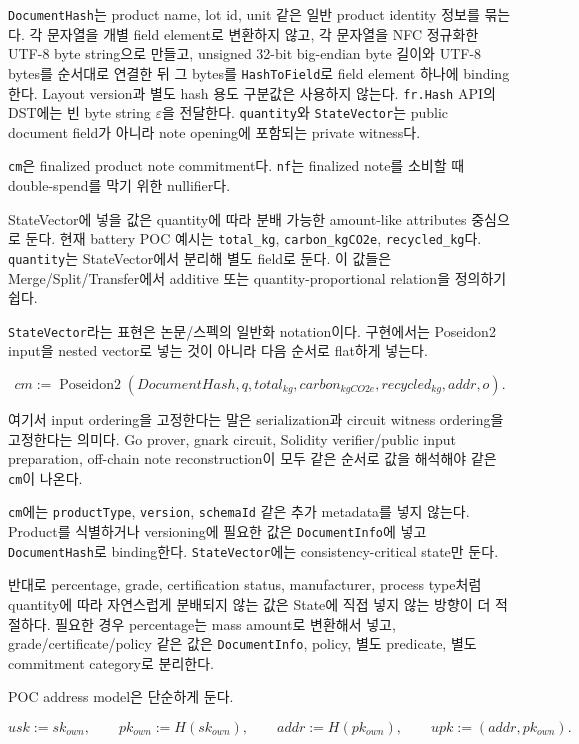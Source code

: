 \documentclass[11pt]{extarticle}
\DeclareMathOperator{\PoseidonTwo}{Poseidon2}
\begin{document}
\texttt{DocumentHash}는 product name, lot id, unit 같은 일반 product
identity 정보를 묶는다. 각 문자열을 개별 field element로 변환하지 않고,
각 문자열을 NFC 정규화한 UTF-8 byte string으로 만들고, unsigned 32-bit
big-endian byte 길이와 UTF-8 bytes를 순서대로 연결한 뒤 그 bytes를
\texttt{HashToField}로 field element 하나에 binding한다. Layout version과 별도
hash 용도 구분값은 사용하지 않는다. \texttt{fr.Hash} API의 DST에는 빈 byte string
$\varepsilon$을 전달한다.
\texttt{quantity}와 \texttt{StateVector}는 public document field가
아니라 note opening에 포함되는 private witness다.

\texttt{cm}은 finalized product note commitment다. \texttt{nf}는
finalized note를 소비할 때 double-spend를 막기 위한 nullifier다.

StateVector에 넣을 값은 quantity에 따라 분배 가능한 amount-like
attributes 중심으로 둔다. 현재 battery POC 예시는 \texttt{total\_kg},
\texttt{carbon\_kgCO2e}, \texttt{recycled\_kg}다. \texttt{quantity}는
StateVector에서 분리해 별도 field로 둔다. 이 값들은
Merge/Split/Transfer에서 additive 또는 quantity-proportional relation을
정의하기 쉽다.

\texttt{StateVector}라는 표현은 논문/스펙의 일반화 notation이다.
구현에서는 Poseidon2 input을 nested vector로 넣는 것이 아니라 다음
순서로 flat하게 넣는다.

\[
cm:=\PoseidonTwo(
\mathit{DocumentHash},q,total_{kg},carbon_{kgCO2e},recycled_{kg},addr,o).
\]

여기서 input ordering을 고정한다는 말은 serialization과 circuit witness
ordering을 고정한다는 의미다. Go prover, gnark circuit, Solidity
verifier/public input preparation, off-chain note reconstruction이 모두
같은 순서로 값을 해석해야 같은 \texttt{cm}이 나온다.

\texttt{cm}에는 \texttt{productType}, \texttt{version},
\texttt{schemaId} 같은 추가 metadata를 넣지 않는다. Product를 식별하거나
versioning에 필요한 값은 \texttt{DocumentInfo}에 넣고
\texttt{DocumentHash}로 binding한다. \texttt{StateVector}에는
consistency-critical state만 둔다.

반대로 percentage, grade, certification status, manufacturer, process
type처럼 quantity에 따라 자연스럽게 분배되지 않는 값은 State에 직접 넣지
않는 방향이 더 적절하다. 필요한 경우 percentage는 mass amount로 변환해서
넣고, grade/certificate/policy 같은 값은 \texttt{DocumentInfo}, policy,
별도 predicate, 별도 commitment category로 분리한다.

POC address model은 단순하게 둔다.

\[
usk:=sk_{own},\qquad
pk_{own}:=H(sk_{own}),\qquad
addr:=H(pk_{own}),\qquad
upk:=(addr,pk_{own}).
\]
\end{document}
